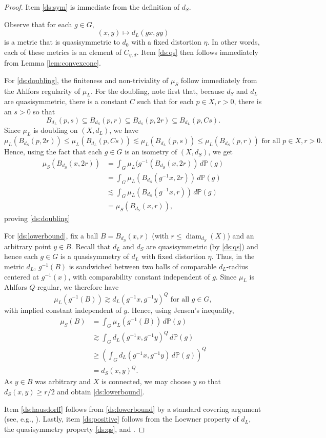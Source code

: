 \documentclass{amsart}
\DeclareMathOperator{\diam}{diam}
\theoremstyle{plain}
\theoremstyle{definition}
\numberwithin{equation}{section}
\numberwithin{theorem}{section}
\begin{document}
\begin{proof}
Item \eqref{ds:sym} is immediate from the definition of $d_S$.

Observe that for each $g\in G$, 
$$ (x,y)\mapsto d_L(gx,gy)$$
is a metric that is quasisymmetric to $d_0$ with a fixed distortion $\eta$. In other words, each of these metrics is an element of $C_{\eta,d}$. Item \eqref{ds:qs} then follows immediately from Lemma \ref{lem:convexcone}. 

For \eqref{ds:doubling}, the finiteness and non-triviality of $\mu_S$ follow immediately from the Ahlfors regularity of $\mu_L$. For the doubling, note first that, because $d_S$ and $d_L$ are quasisymmetric, there is a constant $C$ such that for each $p\in X, r>0$, there is an $s>0$ so that
$$ B_{d_L}(p, s) \subseteq B_{d_S}(p,r) \subseteq B_{d_S}(p, 2r) \subseteq B_{d_L}(p,Cs).$$ 
Since $\mu_L$ is doubling on $(X,d_L)$,  we have
$$ \mu_L(B_{d_S}(p,2r)) \leq \mu_L(B_{d_L}(p,Cs)) \lesssim \mu_L( B_{d_L}(p, s)) \leq \mu_L(B_{d_S}(p,r)) \text{ for all } p\in X, r>0.$$
Hence, using the fact that each $g\in G$ is an isometry of $(X,d_S)$, we get
\begin{align*}
\mu_S(B_{d_S}(x,2r)) &= \int_G \mu_L(g^{-1}(B_{d_S}(x,2r))\, d\mathbb{P}(g)\\
&= \int_G \mu_L(B_{d_S}(g^{-1}x,2r))\, d\mathbb{P}(g)\\
&\lesssim \int_G \mu_L(B_{d_S}(g^{-1}x,r))\, d\mathbb{P}(g)\\
&= \mu_S(B_{d_S}(x,r)),
\end{align*}
proving \eqref{ds:doubling}

For \eqref{ds:lowerbound}, fix a ball $B=B_{d_S}(x,r)$ (with $r\leq \diam_{d_S}(X)$) and an arbitrary point $y\in B$. Recall that $d_L$ and $d_S$ are quasisymmetric (by \eqref{ds:qs}) and hence each $g\in G$ is a quasisymmetry of $d_L$ with fixed distortion $\eta$. Thus, in the metric $d_L$, $g^{-1}(B)$ is sandwiched between two balls of comparable $d_L$-radius centered at $g^{-1}(x)$, with comparability constant independent of $g$. Since $\mu_L$ is Ahlfors $Q$-regular, we therefore have
$$ \mu_L(g^{-1}(B)) \gtrsim d_L(g^{-1}x, g^{-1}y)^Q \text{ for all } g\in G,$$
with implied constant independent of $g$. Hence, using Jensen's inequality,
\begin{align*}
\mu_S(B) &= \int_G \mu_L(g^{-1}(B))\,d\mathbb{P}(g)\\
&\gtrsim \int_G d_L(g^{-1}x, g^{-1}y)^Q\,d\mathbb{P}(g)\\
&\geq \left(\int_G d_L(g^{-1}x, g^{-1}y)\,d\mathbb{P}(g)\right)^Q\\
&= d_S(x,y)^Q.
\end{align*}
As $y\in B$ was arbitrary and $X$ is connected, we may choose $y$ so that $d_S(x,y)\geq r/2$ and obtain \eqref{ds:lowerbound}.


Item \eqref{ds:hausdorff} follows from \eqref{ds:lowerbound} by a standard covering argument (see,  e.g., \cite[Section 2]{AT}). Lastly, item \eqref{ds:positive} follows from the Loewner property of $d_L$, the quasisymmetry property \eqref{ds:qs}, and \cite[Remark 15.18]{He}.
\end{proof}
\end{document}
